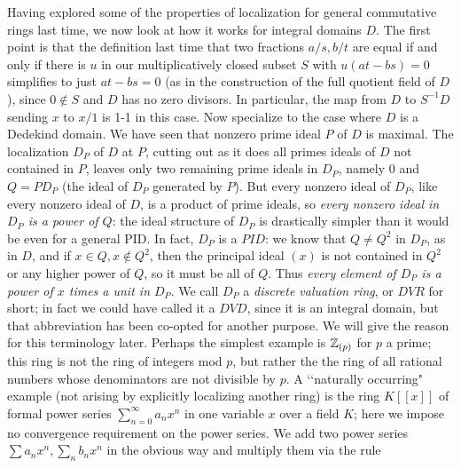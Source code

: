 Having explored some of the properties of localization for general commutative rings last time, we now look at how it works for integral domains $D$.  The first point is that the definition last time that two fractions $a/s,b/t$ are equal if and only if there is $u$ in our multiplicatively closed subset $S$ with $u(at - bs) = 0$ simplifies to just $at - bs = 0$ (as in the construction of the full quotient field of $D$), since $0\notin S$ and $D$ has no zero divisors.  In particular, the map from $D$ to $S^{-1}D$ sending $x$ to $x/1$ is 1-1 in this case.  Now specialize to the case where $D$ is a Dedekind domain.  We have seen that nonzero prime ideal $P$ of $D$ is maximal.  The localization $D_P$ of $D$ at $P$, cutting out as it does all primes ideals of $D$ not contained in $P$, leaves only two remaining prime ideals in $D_P$, namely 0 and $Q=PD_P$ (the ideal of $D_P$ generated by $P$).  But every nonzero ideal of $D_P$, like every nonzero ideal of $D$, is a product of prime ideals, so
{\sl every nonzero ideal in $D_P$ is a power of $Q$}:  the ideal structure of $D_P$ is drastically simpler than it would be even for a general PID.  In fact, $D_P$ is a $PID$:  we know that $Q\ne Q^2$ in $D_P$, as in $D$, and if $x\in Q,x\notin Q^2$, then the principal ideal $(x)$ is not contained in $Q^2$ or any higher power of $Q$, so it must be all of $Q$.  Thus {\sl every element of $D_P$ is a power of $x$ times a unit in $D_P$}.  We call $D_P$ a {\sl discrete valuation ring}, or $DVR$ for short; in fact we could have called it a $DVD$, since it is an integral domain, but that abbreviation has been co-opted for another purpose.  We will give the reason for this terminology later.  Perhaps the simplest example is $\Bbb Z_{(p)}$ for $p$ a prime; this ring is not the ring of integers mod $p$, but rather the the ring of all rational numbers whose denominators are not divisible by $p$.  A
\lq\lq naturally occurring" example (not arising by explicitly localizing another ring) is the ring $K[[x]]$ of formal power series $\sum_{n=0}^\infty a_n x^n$ in one variable $x$ over a field $K$; here we impose no convergence requirement on the power series.  We add two power series $\sum a_n x^n,
\sum_n b_n x^n$ in the obvious way and multiply them via the rule 
